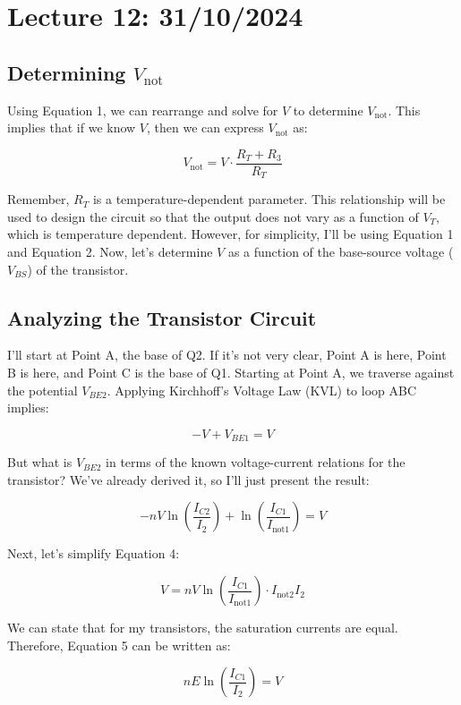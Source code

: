 \section*{Lecture 12: 31/10/2024}

\subsection*{Determining \( V_{\text{not}} \)}

Using Equation 1, we can rearrange and solve for \( V \) to determine \( V_{\text{not}} \). This implies that if we know \( V \), then we can express \( V_{\text{not}} \) as:

\[
V_{\text{not}} = V \cdot \frac{R_T + R_3}{R_T}
\]

Remember, \( R_T \) is a temperature-dependent parameter. This relationship will be used to design the circuit so that the output does not vary as a function of \( V_T \), which is temperature dependent. However, for simplicity, I'll be using Equation 1 and Equation 2. Now, let's determine \( V \) as a function of the base-source voltage (\( V_{BS} \)) of the transistor.

\subsection*{Analyzing the Transistor Circuit}

I'll start at Point A, the base of Q2. If it's not very clear, Point A is here, Point B is here, and Point C is the base of Q1. Starting at Point A, we traverse against the potential \( V_{BE2} \). Applying Kirchhoff's Voltage Law (KVL) to loop ABC implies:

\[
-V + V_{BE1} = V
\]

But what is \( V_{BE2} \) in terms of the known voltage-current relations for the transistor? We've already derived it, so I'll just present the result:

\[
-n V \ln\left(\frac{I_{C2}}{I_2}\right) + \ln\left(\frac{I_{C1}}{I_{\text{not1}}}\right) = V
\]

Next, let's simplify Equation 4:

\[
V = n V \ln\left(\frac{I_{C1}}{I_{\text{not1}}}\right) \cdot I_{\text{not2}} I_2
\]

We can state that for my transistors, the saturation currents are equal. Therefore, Equation 5 can be written as:

\[
n E \ln\left(\frac{I_{C1}}{I_2}\right) = V
\]


